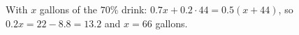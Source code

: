 With $x$ gallons of the $70\%$ drink: $0.7x+0.2\cdot44=0.5(x+44)$, so $0.2x=22-8.8=13.2$ and $x=\boxed{66}$ gallons.
